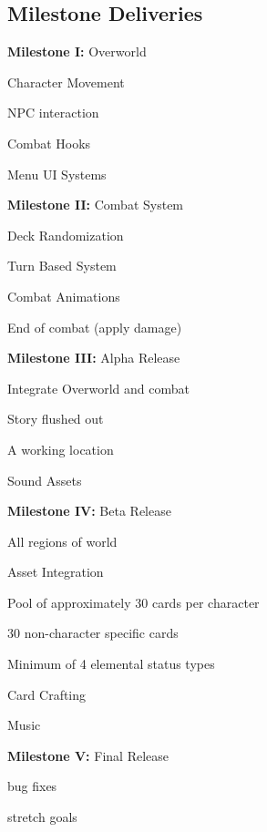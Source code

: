 \documentclass[12pt,titlepage]{article}
\begin{document}
\subsection{Milestone Deliveries}
\begin{todolist}
    \item \textbf{Milestone I:} Overworld
        \begin{todolist}
            \item Character Movement
            \item NPC interaction
            \item Combat Hooks
            \item Menu UI Systems
        \end{todolist}

    \item \textbf{Milestone II:} Combat System
        \begin{todolist}
            \item Deck Randomization
            \item Turn Based System
            \item Combat Animations
            \item End of combat (apply damage)
        \end{todolist}

    \item \textbf{Milestone III:} Alpha Release
        \begin{todolist}
            \item Integrate Overworld and combat
            \item Story flushed out
            \item A working location
            \item Sound Assets
        \end{todolist}

    \item \textbf{Milestone IV:} Beta Release
        \begin{todolist}
            \item All regions of world
            \item Asset Integration
            \item Pool of approximately 30 cards per character
            \item 30 non-character specific cards
            \item Minimum of 4 elemental status types
            \item Card Crafting
            \item Music
        \end{todolist}

    \item \textbf{Milestone V:} Final Release
        \begin{todolist}
            \item bug fixes
            \item stretch goals
        \end{todolist}
\end{todolist}
\end{document}
